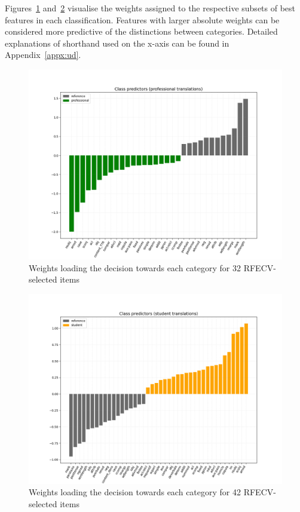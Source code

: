 Figures~\ref{fig:pro-weights} and~\ref{fig:stu-weights} visualise the weights assigned to the respective subsets of best features in each classification. Features with larger absolute weights can be considered more predictive of the distinctions between categories. 
Detailed explanations of shorthand used on the x-axis can be found in Appendix~\ref{appx:ud}.
\vspace{-2em}
\begin{figure}[H]
	\centering
	\includegraphics[width=.80\linewidth]{figures/pro-ref-bars-ud33}
	\caption{\label{fig:pro-weights}Weights loading the decision towards each category for 32 RFECV-selected items}	
\end{figure}
\vspace{-2.5em}
\begin{figure}[H]
	\centering
	\includegraphics[width=.80\linewidth]{figures/stu-ref-bars-ud42}
	\caption{\label{fig:stu-weights}Weights loading the decision towards each category for 42 RFECV-selected items}	
\end{figure}
\vspace{-2.5em}

